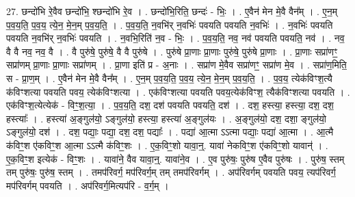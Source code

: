 \documentclass[17pt]{extarticle}
\begin{document}
27. छन्दो॑भि रे॒वैव छन्दो॑भि॒ श्छन्दो॑भि रे॒व । . छन्दो॑भि॒रिति॒ छन्दः॑ - भिः॒ । . ए॒वैन॑ मेन मे॒वै वैन᳚म् । . ए॒न॒म् प॒व॒य॒ति॒ प॒व॒य॒ त्ये॒न॒ मे॒न॒म् प॒व॒य॒ति॒ । . प॒व॒य॒ति॒ न॒वभि॑र् न॒वभिः॑ पवयति पवयति न॒वभिः॑ । . न॒वभिः॑ पवयति पवयति न॒वभि॑र् न॒वभिः॑ पवयति । . न॒वभि॒रिति॑ न॒व - भिः॒ । . प॒व॒य॒ति॒ नव॒ नव॑ पवयति पवयति॒ नव॑ । . नव॒ वै वै नव॒ नव॒ वै । . वै पुरु॑षे॒ पुरु॑षे॒ वै वै पुरु॑षे । . पुरु॑षे प्रा॒णाः प्रा॒णाः पुरु॑षे॒ पुरु॑षे प्रा॒णाः । . प्रा॒णाः सप्रा॑णꣳ॒॒ सप्रा॑णम् प्रा॒णाः प्रा॒णाः सप्रा॑णम् । . प्रा॒णा इति॑ प्र - अ॒नाः । . सप्रा॑ण मे॒वैव सप्रा॑णꣳ॒॒ सप्रा॑ण मे॒व । . सप्रा॑ण॒मिति॒ स - प्रा॒ण॒म् । . ए॒वैन॑ मेन मे॒वै वैन᳚म् । . ए॒न॒म् प॒व॒य॒ति॒ प॒व॒य॒ त्ये॒न॒ मे॒न॒म् प॒व॒य॒ति॒ । . प॒व॒य॒ त्येक॑विꣳश॒त्यै क॑विꣳशत्या पवयति पवय॒ त्येक॑विꣳशत्या । . एक॑विꣳशत्या पवयति पवय॒त्येक॑विꣳश॒ त्यैक॑विꣳशत्या पवयति । . एक॑विꣳश॒त्येत्येक॑ - विꣳ॒॒श॒त्या॒ । . प॒व॒य॒ति॒ दश॒ दश॑ पवयति पवयति॒ दश॑ । . दश॒ हस्त्या॒ हस्त्या॒ दश॒ दश॒ हस्त्याः᳚ । . हस्त्या॑ अ॒ङ्गुल॑यो॒ ऽङ्गुल॑यो॒ हस्त्या॒ हस्त्या॑ अ॒ङ्गुल॑यः । . अ॒ङ्गुल॑यो॒ दश॒ दशा॒ ङ्गुल॑यो॒ ऽङ्गुल॑यो॒ दश॑ । . दश॒ पद्याः॒ पद्या॒ दश॒ दश॒ पद्याः᳚ । . पद्या॑ आ॒त्मा ऽऽत्मा पद्याः॒ पद्या॑ आ॒त्मा । . आ॒त्मै क॑विꣳ॒॒श ए॑कविꣳ॒॒श आ॒त्मा ऽऽत्मै क॑विꣳ॒॒शः । . ए॒क॒विꣳ॒॒शो यावा॒न्॒. यावा॑ नेकविꣳ॒॒श ए॑कविꣳ॒॒शो यावान्॑ । . ए॒क॒विꣳ॒॒श इत्येक॑ - विꣳ॒॒शः । . यावा॑ने॒ वैव यावा॒न्॒. यावा॑ने॒व । . ए॒व पुरु॑षः॒ पुरु॑ष ए॒वैव पुरु॑षः । . पुरु॑ष॒ स्तम् तम् पुरु॑षः॒ पुरु॑ष॒ स्तम् । . तमप॑रिवर्ग॒ मप॑रिवर्ग॒म् तम् तमप॑रिवर्गम् । . अप॑रिवर्गम् पवयति पवय॒ त्यप॑रिवर्ग॒ मप॑रिवर्गम् पवयति । . अप॑रिवर्ग॒मित्यप॑रि - व॒र्ग॒म् । \newline
\end{document}

